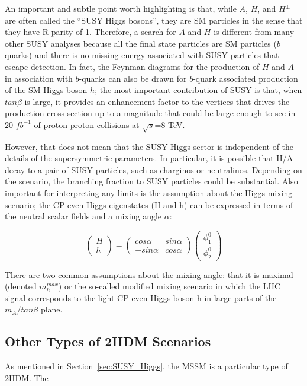 An important and subtle point worth highlighting is that, while $A$, $H$, and $H^\pm$ are often called the ``SUSY Higgs bosons'', they are SM particles in the sense that they have R-parity of 1.  Therefore, a search for $A$ and $H$ is different from many other SUSY analyses because all the final state particles are SM particles ($b$ quarks) and there is no missing energy associated with SUSY particles that escape detection.  In fact, the Feynman diagrams for the production of $H$ and $A$ in association with $b$-quarks can also be drawn for $b$-quark associated production of the SM Higgs boson $h$; the most important contribution of SUSY is that, when $tan\beta$ is large, it provides an enhancement factor to the vertices that drives the production cross section up to a magnitude that could be large enough to see in 20 $fb^{-1}$ of proton-proton collisions at $\sqrt{s}$=8 TeV.

However, that does not mean that the SUSY Higgs sector is independent of the details of the supersymmetric parameters.  In particular, it is possible that H/A decay to a pair of SUSY particles, such as charginos or neutralinos.  Depending on the scenario, the branching fraction to SUSY particles could be substantial.  Also important for interpreting any limits is the assumption about the Higgs mixing scenario; the CP-even Higgs eigenstates (H and h) can be expressed in terms of the neutral scalar fields and a mixing angle $\alpha$:

\begin{equation}
    \begin{pmatrix}
         H \\ h  
    \end{pmatrix}
    = 
    \begin{pmatrix}
        cos\alpha & sin\alpha \\
        -sin\alpha & cos\alpha
    \end{pmatrix}
    \begin{pmatrix}
        \phi^0_1 \\ \phi^0_2
    \end{pmatrix}
\end{equation}

There are two common assumptions about the mixing angle: that it is maximal (denoted $m_h^{max}$) or the so-called modified mixing scenario \cite{Carena-2} in which the LHC signal corresponds to the light CP-even Higgs boson h in large parts of the $m_A/tan\beta$ plane.


\subsection{Other Types of 2HDM Scenarios}
As mentioned in Section~\ref{sec:SUSY_Higgs}, the MSSM is a particular type of 2HDM.  The   


